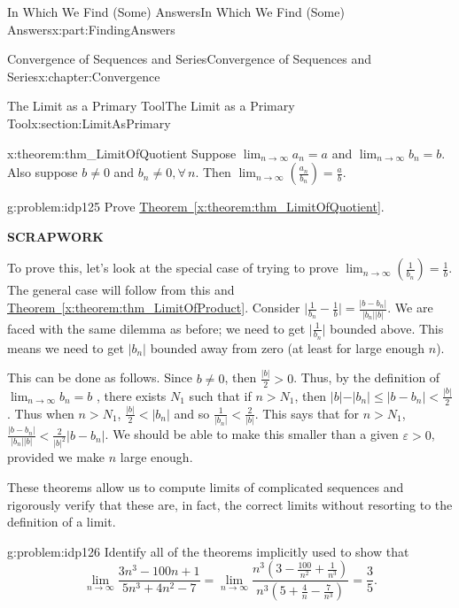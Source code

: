 \documentclass[oneside,10pt,]{book}
\newcommand{\xreffont}{\relax}
\newcommand{\terminology}[1]{\textbf{#1}}
\numberwithin{equation}{section}
\newcommand{\eps}{\varepsilon}
\newcommand{\lt}{<}
\begin{document}
\begin{partptx}{In Which We Find (Some) Answers}{}{In Which We Find (Some) Answers}{}{}{x:part:FindingAnswers}
\begin{chapterptx}{Convergence of Sequences and Series}{}{Convergence of Sequences and Series}{}{}{x:chapter:Convergence}
\begin{sectionptx}{The Limit as a Primary Tool}{}{The Limit as a Primary Tool}{}{}{x:section:LimitAsPrimary}
\begin{theorem}{}{}{x:theorem:thm_LimitOfQuotient}%
 Suppose \(\displaystyle\lim_{n\rightarrow\infty}a_n=a\) and \(\displaystyle\lim_{n\rightarrow\infty}b_n=b\). Also suppose \(b\neq 0\) and \(b_n\neq 0,\forall\,n\). Then \(\displaystyle\lim_{n\rightarrow\infty}\left(\frac{a_n}{b_n}\right)=\frac{a}{b}\).%
\end{theorem}
\begin{problem}{}{g:problem:idp125}%
 Prove \hyperref[x:theorem:thm_LimitOfQuotient]{Theorem~{\xreffont\ref{x:theorem:thm_LimitOfQuotient}}}.%
\par
\terminology{SCRAPWORK}%
\par
To prove this, let's look at the special case of trying to prove \(\lim_{n\rightarrow\infty}\left(\frac{1}{b_n}\right)=\frac{1}{b}\). The general case will follow from this and \hyperref[x:theorem:thm_LimitOfProduct]{Theorem~{\xreffont\ref{x:theorem:thm_LimitOfProduct}}}. Consider \(\big|\frac{1}{b_n}-\frac{1}{b}\big|=\frac{|b-b_n|}{|b_n||b|}\). We are faced with the same dilemma as before; we need to get \(\big|\frac{1}{b_n}\big|\) bounded above. This means we need to get \(|b_n|\) bounded away from zero (at least for large enough \(n\)).%
\par
This can be done as follows. Since \(b\neq 0\), then \(\frac{|b|}{2}>0\). Thus, by the definition of \(\lim_{n\rightarrow\infty}b_n=b\) , there exists \(N_1\) such that if \(n>N_1\), then \(|b\mathopen|-|b_n|\leq\big|b-b_n\big|\lt \frac{|b|}{2}\). Thus when \(n>N_1\), \(\frac{|b|}{2}\lt |b_n|\) and so \(\frac{1}{|b_n|}\lt \frac{2}{|b|}\). This says that for \(n>N_1\), \(\frac{|b-b_n|}{|b_n||b|}\lt \frac{2}{|b|^2}|b-b_n|\). We should be able to make this smaller than a given \(\eps>0\), provided we make \(n\) large enough.%
\end{problem}
These theorems allow us to compute limits of complicated sequences and rigorously verify that these are, in fact, the correct limits without resorting to the definition of a limit.%
\begin{problem}{}{g:problem:idp126}%
 Identify all of the theorems implicitly used to show that%
\begin{equation*}
\lim_{n\rightarrow\infty}\frac{3n^3-100n+1}{5n^3+4n^2-7}=\lim_{n \rightarrow\infty}\frac{n^3\left(3-\frac{100}{n^2}+\frac{1}{n^3}\right)}{n^3 \left(5+\frac{4}{n}-\frac{7}{n^3}\right)}=\frac{3}{5}\text{.}
\end{equation*}

\end{problem}
\end{sectionptx}
\end{chapterptx}
\end{partptx}
\end{document}
